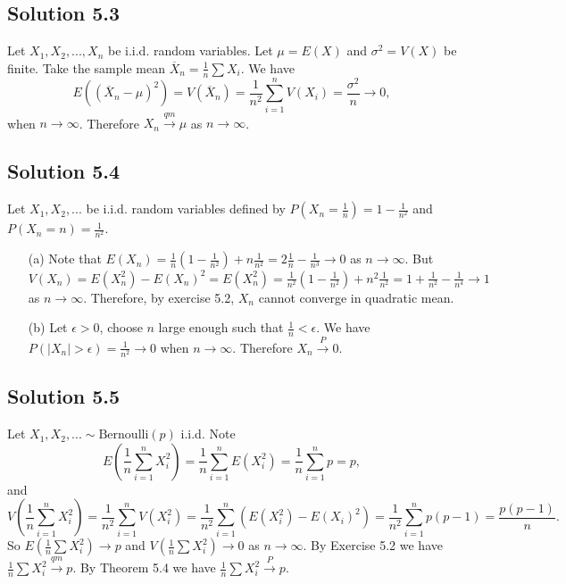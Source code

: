 \subsection*{Solution 5.3}

Let $X_1, X_2, ..., X_n$ be i.i.d. random variables.
Let $\mu = E(X)$ and $\sigma^2 = V(X)$ be finite.
Take the sample mean $\overline{X}_n = \frac{1}{n} \sum X_i$.
We have
\begin{equation*}
    E((\overline{X}_n - \mu)^2) = V(\overline{X}_n)
        = \frac{1}{n^2} \sum_{i = 1}^n V(X_i)
        = \frac{\sigma^2}{n} \to 0,
\end{equation*}
when $n \to \infty$.
Therefore $X_n \xrightarrow{qm} \mu$ as $n \to \infty$.


\subsection*{Solution 5.4}

Let $X_1, X_2, ...$ be i.i.d. random variables defined by $P(X_n = \frac{1}{n}) = 1 - \frac{1}{n^2}$ and $P(X_n = n) = \frac{1}{n^2}$.

\begin{itemize}
    \item[(a)] Note that $E(X_n) = \frac{1}{n}(1 - \frac{1}{n^2}) + n \frac{1}{n^2} = 2 \frac{1}{n} - \frac{1}{n^3} \to 0$ as $n \to \infty$.
        But $V(X_n) = E(X_n^2) - E(X_n)^2 = E(X_n^2) = \frac{1}{n^2}(1 - \frac{1}{n^2}) + n^2 \frac{1}{n^2} = 1 + \frac{1}{n^2} - \frac{1}{n^4} \to 1$ as $n \to \infty$.
        Therefore, by exercise 5.2, $X_n$ cannot converge in quadratic mean.
    \item[(b)] Let $\epsilon > 0$, choose $n$ large enough such that $\frac{1}{n} < \epsilon$.
        We have $P(|X_n| > \epsilon) = \frac{1}{n^2} \to 0$ when $n \to \infty$.
        Therefore $X_n \xrightarrow{P} 0$.
\end{itemize}


\subsection*{Solution 5.5}

Let $X_1, X_2, ... \sim \mathrm{Bernoulli}(p)$ i.i.d.
Note
\begin{equation*}
    E(\frac{1}{n} \sum_{i = 1}^n X_i^2) = \frac{1}{n} \sum_{i = 1}^n E(X_i^2)
        = \frac{1}{n} \sum_{i = 1}^n p
        = p,
\end{equation*}
and
\begin{equation*}
    V(\frac{1}{n} \sum_{i = 1}^n X_i^2) = \frac{1}{n^2} \sum_{i = 1}^n V(X_i^2)
        = \frac{1}{n^2} \sum_{i = 1}^n (E(X_i^2) - E(X_i)^2)
        = \frac{1}{n^2} \sum_{i = 1}^n p(p - 1)
        = \frac{p(p - 1)}{n}.
\end{equation*}
So $E(\frac{1}{n} \sum X_i^2) \to p$ and $V(\frac{1}{n} \sum X_i^2) \to 0$ as $n \to \infty$.
By Exercise 5.2 we have $\frac{1}{n} \sum X_i^2 \xrightarrow{qm} p$.
By Theorem 5.4 we have $\frac{1}{n} \sum X_i^2 \xrightarrow{P} p$.


